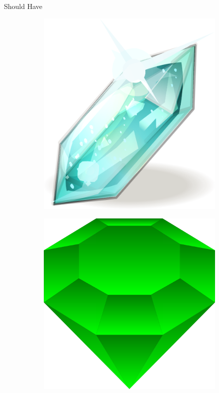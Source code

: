 \begin{frame}{Should Have}
\begin{figure}
\begin{subfigure}{0.45\textwidth}
			\includegraphics[width=\textwidth, height=0.3\textheight, keepaspectratio]{images/Resonanz-Kristall}
		\end{subfigure}
		\begin{subfigure}{0.45\textwidth}
			\centering
			\includegraphics[width=\textwidth, height=0.3\textheight, keepaspectratio]{images/diamond-309694}
		\end{subfigure}
	\end{figure}
\end{frame}

